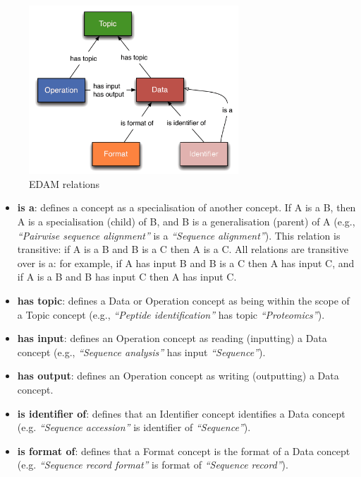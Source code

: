 \documentclass{scrartcl}
\begin{document}
\begin{figure}[h!]
  \centering
  \includegraphics[width=0.7\textwidth]{imgs/EDAMrelations.png}
  \caption{EDAM relations}
  \label{fig:relations}
\end{figure}

\begin{itemize}
  \item \textbf{is a}: defines a concept as a specialisation of 
    another concept. If A is a B, then A is a specialisation (child) 
    of B, and B is a generalisation (parent) of A (e.g., 
    \textit{“Pairwise sequence alignment”} is a \textit{“Sequence alignment”}).
    This relation is transitive: if A is a B and B is a C then A is a C.
    All relations are transitive over is a: for example, if A 
    has input B and B is a C then A has input C, 
    and if A is a B and B has input C then A has input C.
  \item \textbf{has topic}: defines a Data or Operation concept as being 
    within the scope of a Topic concept (e.g., \textit{“Peptide identification”}
    has topic \textit{“Proteomics”}).
  \item \textbf{has input}: defines an Operation concept as reading (inputting) 
    a Data concept (e.g., \textit{“Sequence analysis”} has input 
    \textit{“Sequence”}).
  \item \textbf{has output}: defines an Operation concept as writing (outputting) 
    a Data concept.
  \item \textbf{is identifier of}: defines that an Identifier concept identifies 
    a Data concept (e.g. \textit{“Sequence accession”} 
    is identifier of \textit{“Sequence”}).
  \item \textbf{is format of}: defines that a Format concept is the format of a 
    Data concept (e.g. \textit{“Sequence record format”} is format 
    of \textit{“Sequence record”}).
\end{itemize}
\end{document}
